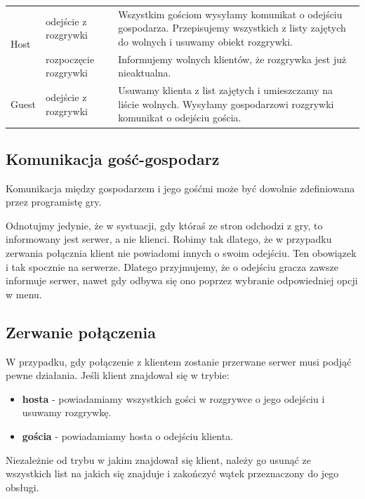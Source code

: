 \documentclass[a4paper, 12pt]{article}
\begin{document}

\begin{center}
 \begin{tabular}{p{1.3cm}||p{3.5cm}||p{9cm}}
\hline
\multirow{2}{*}{Host}
  & odejście z rozgrywki
  & Wszystkim gościom wysyłamy komunikat o odejściu gospodarza. Przepisujemy wszystkich z listy zajętych do wolnych i usuwamy obiekt rozgrywki.\\ \cline{2-3}

  & rozpoczęcie rozgrywki
  & Informujemy wolnych klientów, że rozgrywka jest już nieaktualna.\\ \hline \hline

Guest & odejście z rozgrywki & Usuwamy klienta z list zajętych i umieszczamy na liście wolnych. Wysyłamy gospodarzowi rozgrywki komunikat o odejściu gościa.

\end{tabular}
\end{center}


\subsection{Komunikacja gość-gospodarz}
Komunikacja między gospodarzem i jego gośćmi może być dowolnie zdefiniowana przez programistę gry.

Odnotujmy jedynie, że w systuacji, gdy któraś ze stron odchodzi z gry, to informowany jest serwer, a nie klienci. Robimy tak dlatego, że w przypadku zerwania połącznia klient nie powiadomi innych o swoim odejściu. Ten obowiązek i tak spocznie na serwerze. Dlatego przyjmujemy, że o odejściu gracza zawsze informuje serwer, nawet gdy odbywa się ono poprzez wybranie odpowiedniej opcji w menu.

\subsection{Zerwanie połączenia}
W przypadku, gdy połączenie z klientem zostanie przerwane serwer musi podjąć pewne działania. Jeśli klient znajdował się w trybie:
\begin{itemize}
 \item \textbf{hosta} - powiadamiamy wszystkich gości w rozgrywce o jego odejściu i usuwamy rozgrywkę.
 \item \textbf{gościa} - powiadamiamy hosta o odejściu klienta.
\end{itemize}
 Niezależnie od trybu w jakim znajdował się klient, należy go usunąć ze wszystkich list na jakich się znajduje i zakończyć wątek przeznaczony do jego obsługi.
\end{document}
